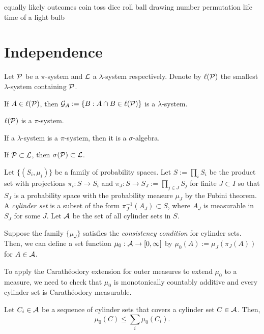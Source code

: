 \documentclass{../../large}
\begin{document}
equally likely outcomes
	coin toss
	dice roll
	ball drawing
	number permutation
	life time of a light bulb






\chapter{Independence}


\begin{prb}
Let $\mathcal{P}$ be a $\pi$-system and $\mathcal{L}$ a $\lambda$-system respectively.
Denote by $\ell(\mathcal{P})$ the smallest $\lambda$-system containing $\mathcal{P}$.
\begin{parts}
\item If $A\in\ell(\mathcal{P})$, then $\mathcal{G}_A:=\{B:A\cap B\in\ell(\mathcal{P})\}$ is a $\lambda$-system.
\item $\ell(\mathcal{P})$ is a $\pi$-system.
\item If a $\lambda$-system is a $\pi$-system, then it is a $\sigma$-algebra.
\item If $\mathcal{P}\subset\mathcal{L}$, then $\sigma(\mathcal{P})\subset\mathcal{L}$.
\end{parts}
\end{prb}

\begin{prb}

\end{prb}

\begin{prb}
Let $\{(S_i,\mu_i)\}$ be a family of probability spaces.
Let $S:=\prod_iS_i$ be the product set with projections $\pi_i:S\to S_i$ and $\pi_J:S\to S_J:=\prod_{j\in J}S_j$ for finite $J\subset I$ so that $S_J$ is a probability space with the probability measure $\mu_J$ by the Fubini theorem.
A \emph{cylinder set} is a subset of the form $\pi_J^{-1}(A_J)\subset S$, where $A_J$ is measurable in $S_J$ for some $J$.
Let $\mathcal{A}$ be the set of all cylinder sets in $S$.

Suppose the family $\{\mu_J\}$ satisfies the \emph{consistency condition} for cylinder sets.
Then, we can define a set function $\mu_0:\mathcal{A}\to[0,\infty]$ by $\mu_0(A):=\mu_J(\pi_J(A))$ for $A\in\mathcal{A}$.
\end{prb}
\begin{pf}
To apply the Carath\'eodory extension for outer measures to extend $\mu_0$ to a measure, we need to check that $\mu_0$ is monotonically countably additive and every cylinder set is Carath\'eodory measurable.


Let $C_i\in\mathcal{A}$ be a sequence of cylinder sets that covers a cylinder set $C\in\mathcal{A}$.
Then,
\[\mu_0(C)\le\sum_i\mu_0(C_i).\]

\end{pf}
\end{document}
